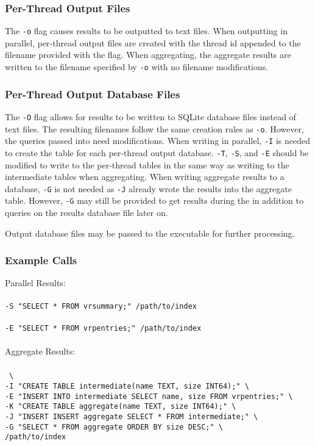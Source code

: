 \subsubsection{Per-Thread Output Files}
The \texttt{-o} flag causes results to be outputted to text
files. When outputting in parallel, per-thread output files are
created with the thread id appended to the filename provided with the
flag. When aggregating, the aggregate results are written to the
filename specified by \texttt{-o} with no filename modifications.

\subsubsection{Per-Thread Output Database Files}
The \texttt{-O} flag allows for results to be written to SQLite
database files instead of text files. The resulting filenames follow
the same creation rules as \texttt{-o}. However, the queries passed
into \gufiquery need modifications. When writing in parallel,
\texttt{-I} is needed to create the table for each per-thread output
database. \texttt{-T}, \texttt{-S}, and \texttt{-E} should be modified
to write to the per-thread tables in the same way as writing to the
intermediate tables when aggregating. When writing aggregate results
to a database, \texttt{-G} is not needed as \texttt{-J} already wrote
the results into the aggregate table. However, \texttt{-G} may still
be provided to get results during the \gufiquery in addition to
queries on the results database file later on.

Output database files may be passed to the \querydbs executable for
further processing.

\subsubsection{Example Calls}

\noindent Parallel Results:
\\\\
\indent \gufiquery \texttt{-S "SELECT * FROM vrsummary;"~/path/to/index}
\\\\
\indent \gufiquery \texttt{-E "SELECT * FROM vrpentries;"~/path/to/index}
\\\\
\noindent Aggregate Results:
\\\\
\indent \gufiquery~\texttt{\textbackslash} \\
\indent \texttt{-I "CREATE TABLE intermediate(name TEXT, size INT64);"~\textbackslash} \\
\indent \texttt{-E "INSERT INTO intermediate SELECT name, size FROM vrpentries;"~\textbackslash} \\
\indent \texttt{-K "CREATE TABLE aggregate(name TEXT, size INT64);"~\textbackslash} \\
\indent \texttt{-J "INSERT INSERT aggregate SELECT * FROM intermediate;"~\textbackslash} \\
\indent \texttt{-G "SELECT * FROM aggregate ORDER BY size DESC;"~\textbackslash} \\
\indent \texttt{/path/to/index}


